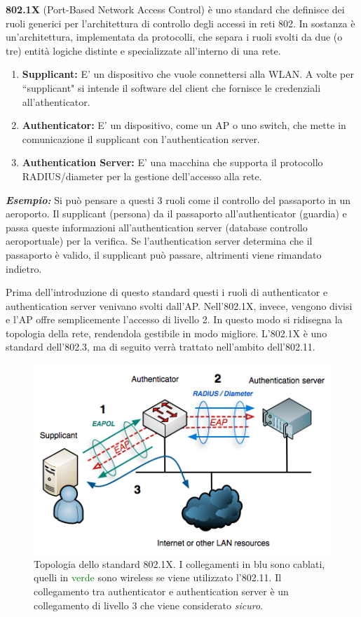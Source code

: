 \textbf{802.1X} (Port-Based Network Access Control) è uno standard che definisce dei ruoli generici per l'architettura di controllo degli accessi in reti 802. In sostanza è un'architettura, implementata da protocolli, che separa i ruoli svolti da due (o tre) entità logiche distinte e specializzate all'interno di una rete.
\begin{enumerate}
\item \textbf{Supplicant:} E' un dispositivo che vuole connettersi alla WLAN. A volte per \textquotedblleft supplicant" si intende il software del client che fornisce le credenziali all'athenticator. 
\item \textbf{Authenticator:} E' un dispositivo, come un AP o uno switch, che mette in comunicazione il supplicant con l'authentication server.
\item \textbf{Authentication Server:} E' una macchina che supporta il protocollo RADIUS/diameter per la gestione dell'accesso alla rete.
\end{enumerate}

\textit{\textbf{Esempio:}} Si può pensare a questi 3 ruoli come il controllo del passaporto in un aeroporto. Il supplicant (persona) da il passaporto all'authenticator (guardia) e passa queste informazioni all'authentication server (database controllo aeroportuale) per la verifica. Se l'authentication server determina che il passaporto è valido, il supplicant può passare, altrimenti viene rimandato indietro. 
 
 Prima dell'introduzione di questo standard questi i ruoli di authenticator e authentication server venivano svolti dall'AP. Nell'802.1X, invece, vengono divisi e l'AP offre semplicemente l'accesso di livello 2. In questo modo si ridisegna la topologia della rete, rendendola gestibile in modo migliore. L'802.1X è uno standard dell'802.3, ma di seguito verrà trattato nell'ambito dell'802.11.

\begin{figure}[htbp]
	\centering
	\includegraphics[scale = 0.6]{images/802_1X}
	\caption{Topologia dello standard 802.1X. I collegamenti in blu sono cablati, quelli in {\textcolor{green}{verde}} sono wireless se viene utilizzato l'802.11. Il collegamento tra authenticator e authentication server è un collegamento di livello 3 che viene considerato \textit{sicuro}.}
	\label{img:802.1x-topology}
\end{figure}

